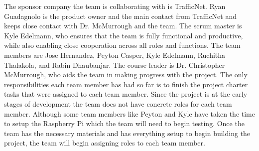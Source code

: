The sponsor company the team is collaborating with is TrafficNet. Ryan Guadagnolo is the product owner and the main contact from TrafficNet and keeps close contact with Dr. McMurrough and the team. The scrum master is Kyle Edelmann, who ensures that the team is fully functional and productive, while also enabling close cooperation across all roles and functions. The team members are Jose Hernandez, Peyton Casper, Kyle Edelmann, Ruchitha Thalakola, and Rabin Dhaubanjar. The course leader is Dr. Christopher McMurrough, who aids the team in making progress with the project. The only responsibilities each team member has had so far is to finish the project charter tasks that were assigned to each team member. Since the project is at the early stages of development the team does not have concrete roles for each team member. Although some team members like Peyton and Kyle have taken the time to setup the Raspberry Pi which the team will need to begin testing. Once the team has the necessary materials and has everything setup to begin building the project, the team will begin assigning roles to each team member.
